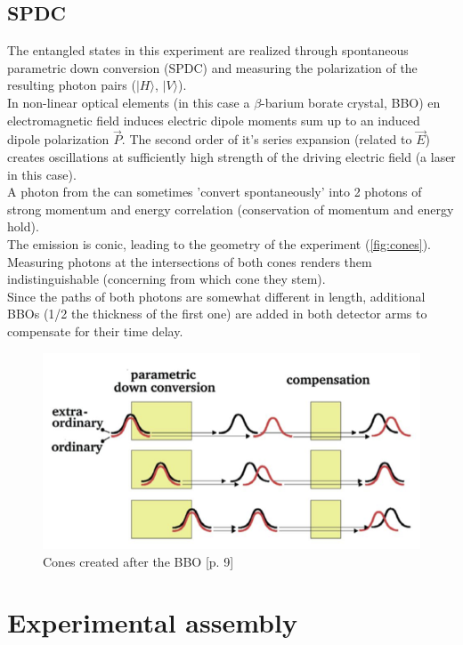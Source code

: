 \documentclass[12pt,a4paper]{article}
\begin{document}
\begin{multicols}{2}
\subsection{SPDC}
\label{SPDC}
The entangled states in this experiment are realized through spontaneous parametric down conversion (SPDC) and measuring the polarization of the resulting photon pairs ($|H\rangle$, $|V\rangle$).\\
In non-linear optical elements (in this case a $\beta$-barium borate crystal, BBO) en electromagnetic field induces electric dipole moments sum up to an induced dipole polarization $\vec{P}$. The second order of it's series expansion (related to $\vec{E}$) creates oscillations at sufficiently high strength of the driving electric field (a laser in this case).\\
A photon from the can sometimes 'convert spontaneously' into 2 photons of strong momentum and energy correlation (conservation of momentum and energy hold).\\
The emission is conic, leading to the geometry of the experiment (\ref{fig:cones}). Measuring photons at the intersections of both cones renders them indistinguishable (concerning from which cone they stem).\\
Since the paths of both photons are somewhat different in length, additional BBOs (1/2 the thickness of the first one) are added in both detector arms to compensate for their time delay.

\begin{figure}[H]
 \centering
 \includegraphics[scale=0.75]{./figures/compensation.png}
 \caption{Cones created after the BBO \cite{physikwiki}[p. 9]}
 \label{fig:compensation}
\end{figure}


\section{Experimental assembly}


\end{multicols}
\end{document}
